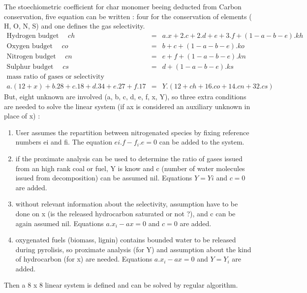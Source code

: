 The stoechiometric coefficient for char monomer beeing deducted from Carbon
conservation, five equation can be written : four for the conservation of
elements ( H, O, N, S) and one defines the gas selectivity.
\begin{eqnarray}
  \text{Hydrogen budget  } \quad ch &=& a.x + 2.c + 2.d + e + 3.f +(1-a-b-e).kh \nonumber \\
  \text{Oxygen budget    } \quad co &=& b + c + (1-a-b-e) . ko \nonumber \\
  \text{Nitrogen budget  } \quad cn &=& e + f + (1-a-b-e).kn \nonumber \\
  \text{Sulphur budget   } \quad cs &=& d + (1-a-b-e) .ks \nonumber \\
  \text{mass ratio of gases or selectivity} \nonumber \\
  a.(12+x) + b.28 +c.18+d.34+e.27+f.17 &=& Y .(12+ch+16.co+14.cn+32.cs)
\end{eqnarray}
But, eight unknown are involved (a, b, c, d, e, f, x, Y), so three extra
conditions are needed to solve the linear system (if ax is considered an
auxiliary unknown in place of x) :
\begin{enumerate}

\item User assumes the repartition between nitrogenated species by fixing
  reference numbers ei and fi. The equation $ei.f-f_i.e=0$ can be added to the
  system.
\item if the proximate analysis can be used to determine the ratio of gases
  issued from an high rank coal or fuel, Y is know and c (number of water
  molecules issued from decomposition) can be assumed nil. Equations $Y=Yi$ and
  $c=0$ are added.
\item without relevant information about the selectivity, assumption have to be
  done on x (is the released hydrocarbon saturated or not ?), and c can be again
  assumed nil. Equations $a.x_i-ax = 0$ and $c=0$ are added.
\item oxygenated fuels (biomass, lignin) contains bounded water to be released
  during pyrolisis, so proximate analysis (for Y) and assumption about the kind
  of hydrocarbon (for x) are needed. Equations $a.x_i-ax = 0$ and $Y=Y_i$ are
  added.

\end{enumerate}
Then a 8 x 8 linear system is defined and can be solved by regular algorithm.
 
